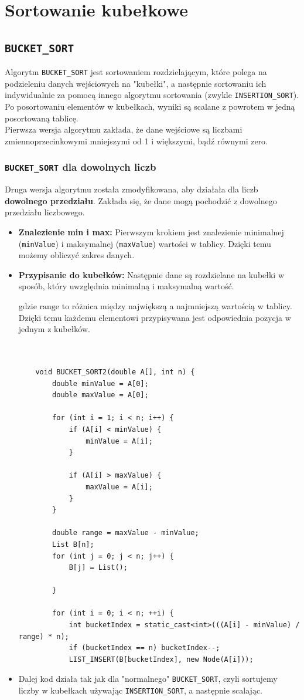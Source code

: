 \documentclass{article}
\begin{document}
\section{Sortowanie kubełkowe}
\subsection{\texttt{BUCKET\_SORT}}
Algorytm \texttt{BUCKET\_SORT} jest sortowaniem rozdzielającym, które polega na podzieleniu danych wejściowych na "kubełki", a następnie sortowaniu ich indywidualnie za pomocą innego algorytmu sortowania (zwykle \texttt{INSERTION\_SORT}). Po posortowaniu elementów w kubełkach, wyniki są scalane z powrotem w jedną posortowaną tablicę.\\
Pierwsza wersja algorytmu zakłada, że dane wejściowe są liczbami zmiennoprzecinkowymi mniejszymi od 1 i większymi, bądź równymi zero.


\subsubsection{\texttt{BUCKET\_SORT} dla dowolnych liczb}
Druga wersja algorytmu została zmodyfikowana, aby działała dla liczb \textbf{dowolnego przedziału}. Zakłada się, że dane mogą pochodzić z dowolnego przedziału liczbowego.

\begin{itemize}
	\item \textbf{Znalezienie min i max:} Pierwszym krokiem jest znalezienie minimalnej (\texttt{minValue}) i maksymalnej (\texttt{maxValue}) wartości w tablicy. Dzięki temu możemy obliczyć zakres danych.
	
	\item \textbf{Przypisanie do kubełków:} Następnie dane są rozdzielane na kubełki w sposób, który uwzględnia minimalną i maksymalną wartość. 

	gdzie \(\text{range}\) to różnica między największą a najmniejszą wartością w tablicy. Dzięki temu każdemu elementowi przypisywana jest odpowiednia pozycja w jednym z kubełków.
	
\begin{lstlisting}
	
	
	void BUCKET_SORT2(double A[], int n) {
		double minValue = A[0];
		double maxValue = A[0];

		for (int i = 1; i < n; i++) {
			if (A[i] < minValue) {
				minValue = A[i];
			}
			
			if (A[i] > maxValue) {
				maxValue = A[i];
			}
		}
		
		double range = maxValue - minValue;
		List B[n];
		for (int j = 0; j < n; j++) {
			B[j] = List();

		}
		
		for (int i = 0; i < n; ++i) {
			int bucketIndex = static_cast<int>(((A[i] - minValue) / range) * n);
			if (bucketIndex == n) bucketIndex--;
			LIST_INSERT(B[bucketIndex], new Node(A[i]));
\end{lstlisting}
\item Dalej kod działa tak jak dla "normalnego" \texttt{BUCKET\_SORT}, czyli sortujemy liczby w kubełkach używając \texttt{INSERTION\_SORT}, a następnie scalając.
	
\end{itemize}
\end{document}
